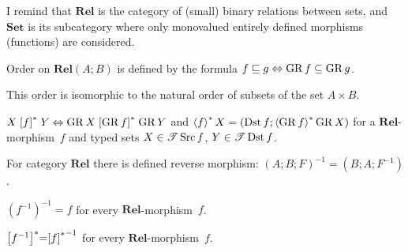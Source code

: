 I remind that $\mathbf{Rel}$ is the category of (small) binary relations
between sets, and $\mathbf{Set}$ is its subcategory where only monovalued
entirely defined morphisms (functions) are considered.
\begin{defn}
Order on $\mathbf{Rel}(A;B)$ is defined by the formula $f\sqsubseteq g\Leftrightarrow\operatorname{GR} f\subseteq\operatorname{GR} g$.\end{defn}
\begin{obvious}
This order is isomorphic to the natural order of subsets of the set
$A\times B$.\end{obvious}
\begin{defn}
$X\mathrel{\left[f\right]^{\ast}}Y\Leftrightarrow\operatorname{GR} X\mathrel{\left[\operatorname{GR} f\right]^{\ast}}\operatorname{GR} Y$ and $\left\langle f\right\rangle ^{\ast}X=(\operatorname{Dst} f;\left\langle \operatorname{GR} f\right\rangle ^{\ast}\operatorname{GR} X)$
for a $\mathbf{Rel}$-morphism~$f$ and typed sets $X\in\mathscr{T}\operatorname{Src} f$,
$Y\in\mathscr{T}\operatorname{Dst} f$.
\end{defn}

\begin{defn}
For category $\mathbf{Rel}$ there is defined reverse morphism: $(A;B;F)^{-1}=(B;A;F^{-1})$.\end{defn}
\begin{obvious}
$(f^{-1})^{-1}=f$ for every $\mathbf{Rel}$-morphism~$f$.
\end{obvious}

\begin{obvious}
$\mathrel{\left[f^{-1}\right]^{\ast}}=\mathrel{\left[f\right]^{\ast}}^{-1}$ for every $\mathbf{Rel}$-morphism~$f$.
\end{obvious}

